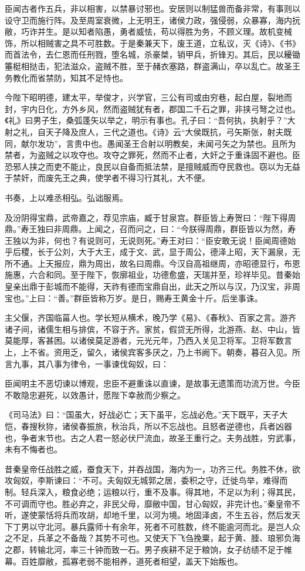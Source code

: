 \documentclass[]{article}
\begin{document}
臣闻古者作五兵，非以相害，以禁暴讨邪也。安居则以制猛兽而备非常，有事则以设守卫而施行阵。及至周室衰微，上无明王，诸侯力政，强侵弱，众暴寡，海内抏敝，巧诈并生。是以知者陷愚，勇者威怯，苟以得胜为务，不顾义理。故机变械饰，所以相贼害之具不可胜数。于是秦兼天下，废王道，立私议，灭《诗》、《书》而首法令，去仁恩而任刑戮，堕名城，杀豪桀，销甲兵，折锋刃。其后，民以耰锄箠梃相挞击，犯法滋众，盗贼不胜，至于赭衣塞路，群盗满山，卒以乱亡。故圣王务教化而省禁防，知其不足恃也。

今陛下昭明德，建太平，举俊才，兴学官，三公有司或由穷巷，起白屋，裂地而封，宇内日化，方外乡风，然而盗贼犹有者，郡国二千石之罪，非挟弓弩之过也。《礼》曰男子生，桑弧蓬矢以举之，明示有事也。孔子曰：``吾何执，执射乎？''大射之礼，自天子降及庶人，三代之道也。《诗》云``大侯既抗，弓矢斯张，射夫既同，献尔发功''，言贵中也。愚闻圣王合射以明教矣，未闻弓矢之为禁也。且所为禁者，为盗贼之以攻夺也。攻夺之罪死，然而不止者，大奸之于重诛固不避也。臣恐邪人挟之而吏不能止，良民以自备而抵法禁，是擅贼威而夺民救也。窃以为无益于禁奸，而废先王之典，使学者不得习行其礼，大不便。

书奏，上以难丞相弘。弘诎服焉。

及汾阴得宝鼎，武帝嘉之，荐见宗庙，臧于甘泉宫。群臣皆上寿贺曰：``陛下得周鼎。''寿王独曰非周鼎。上闻之，召而问之，曰：``今朕得周鼎，群臣皆以为然，寿王独以为非，何也？有说则可，无说则死。''寿王对曰：``臣安敢无说！臣闻周德始乎后稷，长于公刘，大于大王，成于文、武，显于周公，德泽上昭，天下漏泉，无所不通。上天报应，鼎为周出，故名曰周鼎。今汉自高祖继周，亦昭德显行，布恩施惠，六合和同。至于陛下，恢廓祖业，功德愈盛，天瑞并至，珍祥毕见。昔秦始皇亲出鼎于彭城而不能得，天祚有德而宝鼎自出，此天之所以与汉，乃汉宝，非周宝也。''上曰：``善。''群臣皆称万岁。是日，赐寿王黄金十斤。后坐事诛。

主父偃，齐国临菑人也。学长短从横术，晚乃学《易》、《春秋》、百家之言。游齐诸子间，诸儒生相与排傧，不容于齐。家贫，假贷无所得，北游燕、赵、中山，皆莫能厚，客甚困。以诸侯莫足游者，元光元年，乃西入关见卫将军。卫将军数言上，上不省。资用乏，留久，诸侯宾客多厌之，乃上书阙下。朝奏，暮召入见。所言九事，其八事为律令，一事谏伐匈奴，曰：

臣闻明主不恶切谏以博观，忠臣不避重诛以直谏，是故事无遗策而功流万世。今臣不敢隐忠避死，以效愚计，愿陛下幸赦而少察之。

《司马法》曰：``国虽大，好战必亡；天下虽平，忘战必危。''天下既平，天子大恺，春搜秋狝，诸侯春振旅，秋治兵，所以不忘战也。且怒者逆德也，兵者凶器也，争者末节也。古之人君一怒必伏尸流血，故圣王重行之。夫务战胜，穷武事，未有不悔者也。

昔秦皇帝任战胜之威，蚕食天下，并吞战国，海内为一，功齐三代。务胜不休，欲攻匈奴，李斯谏曰：``不可。夫匈奴无城郭之居，委积之守，迁徙鸟举，难得而制。轻兵深入，粮食必绝；运粮以行，重不及事。得其地，不足以为利；得其民，不可调而守也。胜必弃之，非民父母，靡敝中国，甘心匈奴，非完计也。''秦皇帝不听，遂使蒙恬将兵而攻胡，却地千里，以河为境。地固泽卤，不生五谷，然后发天下丁男以守北河。暴兵露师十有余年，死者不可胜数，终不能逾河而北。是岂人众之不足，兵革之不备哉？其势不可也。又使天下飞刍挽粟，起于黄、腄、琅邪负海之郡，转输北河，率三十钟而致一石。男子疾耕不足于粮饷，女子纺绩不足于帷幕。百姓靡敝，孤寡老弱不能相养，道死者相望，盖天下始叛也。
\end{document}

